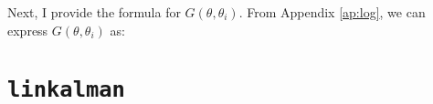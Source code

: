 \documentclass[10pt]{article}
\numberwithin{equation}{section}
\begin{document}
Next, I provide the formula for $G(\theta,\theta_i)$. From Appendix \ref{ap:log}, we can express $G(\theta,\theta_i)$ as:










































\section{\texttt{linkalman}} \label{sec:codebase}
\end{document}
